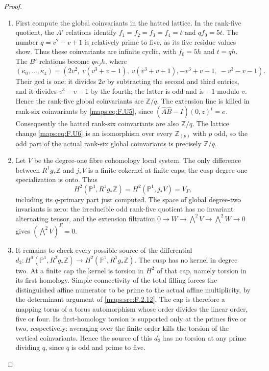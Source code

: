 \documentclass[11pt,a4paper]{article}
\theoremstyle{definition}
\begin{document}
\begin{proof}
\begin{enumerate}[label=\arabic*.]
\item First compute the global coinvariants in the hatted lattice.
In the rank-five quotient, the $A'$ relations identify
$f_1=f_2=f_3=f_4=t$ and $qf_0=5t$.
The number $q=v^2-v+1$ is relatively prime to five, as its
five residue values show.  Thus these coinvariants are
infinite cyclic, with $f_0=5h$ and $t=qh$.
The $B'$ relations become $q\kappa_j h$, where
\[
 (\kappa_0,\ldots,\kappa_4)=
 (2v^2,\ v(v^3+v-1),\ v(v^3+v+1),
       -v^3+v+1,\ -v^3-v-1).
 \tag{F.U10}\label{maps:eq:F.U10}
\]
Their gcd is one: it divides $2v$ by subtracting the second
and third entries, and it divides $v^3-v-1$ by the fourth;
the latter is odd and is $-1$ modulo $v$.
Hence the rank-five global coinvariants are $\mathbb Z/q$.
The extension line is killed in rank-six coinvariants by
\eqref{maps:eq:F.U5}, since
$(\widehat A\widehat B-I)(0,z)^t=e$.
Consequently the hatted rank-six coinvariants are also
$\mathbb Z/q$.  The lattice change \eqref{maps:eq:F.U6} is an isomorphism
over every $\mathbb Z_{(p)}$ with $p$ odd, so the odd part of
the actual rank-six global coinvariants is precisely
$\mathbb Z/q$.

\item Let $V$ be the degree-one fibre cohomology local system.
The only difference between $R^1g_*\mathbb Z$ and $j_*V$
is a finite cokernel at finite caps; the cusp degree-one
specialization is onto.  Thus
\[
 H^2(\mathbb P^1,R^1g_*\mathbb Z)
 =H^2(\mathbb P^1,j_*V)=V_\Gamma,
\]
including its $q$-primary part just computed.  The space of
global degree-two invariants is zero: the irreducible odd
rank-five quotient has no invariant alternating tensor,
and the extension filtration
$0\to W\to\bigwedge^2V\to\bigwedge^2W\to0$
gives $(\bigwedge^2V)^\Gamma=0$.

\item It remains to check every possible source of the differential
$d_2:H^0(\mathbb P^1,R^2g_*\mathbb Z)
\to H^2(\mathbb P^1,R^1g_*\mathbb Z)$.
The cusp has no kernel in degree two.  At a finite cap the
kernel is torsion in $H^2$ of that cap, namely torsion in its
first homology.  Simple connectivity of the total filling
forces the distinguished affine numerator to be prime to the
actual affine multiplicity, by the determinant argument of
\ref{maps:src:F.2.12}.  The cap is therefore a mapping torus of a torus
automorphism whose order divides the linear order, five or
four.  Its first-homology torsion is supported only at the
primes five or two, respectively: averaging over the finite
order kills the torsion of the vertical coinvariants.
Hence the source of this $d_2$ has no torsion at any prime
dividing $q$, since $q$ is odd and prime to five.


\end{enumerate}
\end{proof}
\end{document}
